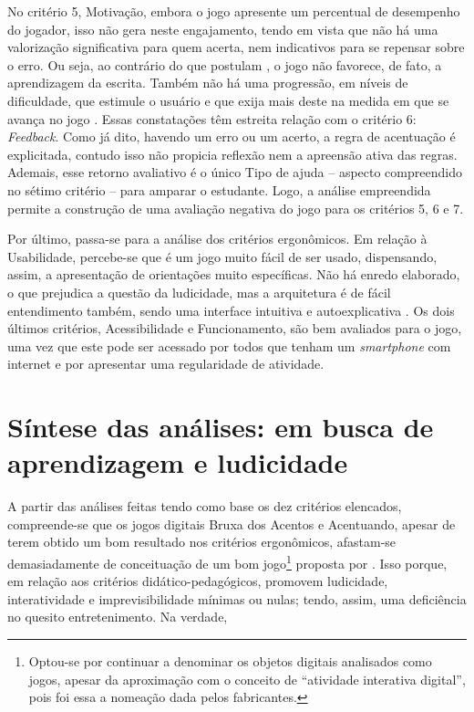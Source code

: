 \documentclass{textolivre}
\begin{document}
No critério 5, Motivação, embora o jogo apresente um percentual de desempenho do jogador, isso não gera neste engajamento, tendo em vista que não há uma valorização significativa para quem acerta, nem indicativos para se repensar sobre o erro. Ou seja, ao contrário do que postulam \textcite{ribeiro2009}, o jogo não favorece, de fato, a aprendizagem da escrita. Também não há uma progressão, em níveis de dificuldade, que estimule o usuário e que exija mais deste na medida em que se avança no jogo \cite{ribeiro2009}. Essas constatações têm estreita relação com o critério 6: \emph{Feedback}. Como já dito, havendo um erro ou um acerto, a regra de acentuação é explicitada, contudo isso não propicia reflexão nem a apreensão ativa das regras. Ademais, esse retorno avaliativo é o único Tipo de ajuda – aspecto compreendido no sétimo critério – para amparar o estudante. Logo, a análise empreendida permite a construção de uma avaliação negativa do jogo para os critérios 5, 6 e 7.

Por último, passa-se para a análise dos critérios ergonômicos. Em relação à Usabilidade, percebe-se que é um jogo muito fácil de ser usado, dispensando, assim, a apresentação de orientações muito específicas. Não há enredo elaborado, o que prejudica a questão da ludicidade, mas a arquitetura é de fácil entendimento também, sendo uma interface intuitiva e autoexplicativa \cite{ribeiro2009}. Os dois últimos critérios, Acessibilidade e Funcionamento, são bem avaliados para o jogo, uma vez que este pode ser acessado por todos que tenham um \emph{smartphone} com internet e por apresentar uma regularidade de atividade.

\section{Síntese das análises: em busca de aprendizagem e ludicidade}\label{sec-6}
A partir das análises feitas tendo como base os dez critérios elencados, compreende-se que os jogos digitais Bruxa dos Acentos e Acentuando, apesar de terem obtido um bom resultado nos critérios ergonômicos, afastam-se demasiadamente de conceituação de um bom jogo\footnote{Optou-se por continuar a denominar os objetos digitais analisados como jogos, apesar da aproximação com o conceito de “atividade interativa digital”, pois foi essa a nomeação dada pelos fabricantes.} proposta por \textcite{leffa2012}. Isso porque, em relação aos critérios didático-pedagógicos, promovem ludicidade, interatividade e imprevisibilidade mínimas ou nulas; tendo, assim, uma deficiência no quesito entretenimento. Na verdade,
\end{document}
